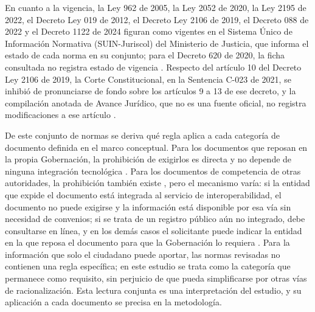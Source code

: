En cuanto a la vigencia, la Ley 962 de 2005, la Ley 2052 de 2020, la Ley 2195 de 2022, el Decreto Ley 019 de 2012, el Decreto Ley 2106 de 2019, el Decreto 088 de 2022 y el Decreto 1122 de 2024 figuran como vigentes en el Sistema Único de Información Normativa (SUIN-Juriscol) del Ministerio de Justicia, que informa el estado de cada norma en su conjunto; para el Decreto 620 de 2020, la ficha consultada no registra estado de vigencia . Respecto del artículo 10 del Decreto Ley 2106 de 2019, la Corte Constitucional, en la Sentencia C-023 de 2021, se inhibió de pronunciarse de fondo sobre los artículos 9 a 13 de ese decreto, y la compilación anotada de Avance Jurídico, que no es una fuente oficial, no registra modificaciones a ese artículo .

De este conjunto de normas se deriva qué regla aplica a cada categoría de documento definida en el marco conceptual. Para los documentos que reposan en la propia Gobernación, la prohibición de exigirlos es directa y no depende de ninguna integración tecnológica \parencite[art.~9]{colombia2012decreto019}. Para los documentos de competencia de otras autoridades, la prohibición también existe \parencites[art.~1, num.~1]{colombia2005ley962}[art.~9]{colombia2012decreto019}, pero el mecanismo varía: si la entidad que expide el documento está integrada al servicio de interoperabilidad, el documento no puede exigirse y la información está disponible por esa vía sin necesidad de convenios; si se trata de un registro público aún no integrado, debe consultarse en línea, y en los demás casos el solicitante puede indicar la entidad en la que reposa el documento para que la Gobernación lo requiera \parencites[art.~9]{colombia2012decreto019}[art.~10]{colombia2019decreto2106}. Para la información que solo el ciudadano puede aportar, las normas revisadas no contienen una regla específica; en este estudio se trata como la categoría que permanece como requisito, sin perjuicio de que pueda simplificarse por otras vías de racionalización. Esta lectura conjunta es una interpretación del estudio, y su aplicación a cada documento se precisa en la metodología.

